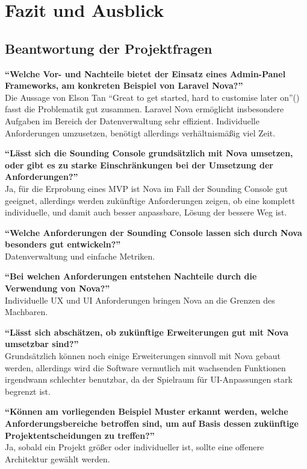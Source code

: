 \section{Fazit und Ausblick}

\subsection{Beantwortung der Projektfragen}

\textbf{\enquote{Welche Vor- und Nachteile bietet der Einsatz eines Admin-Panel Frameworks, am konkreten Beispiel von Laravel Nova?}}\\
Die Aussage von Elson Tan \enquote{Great to get started, hard to customise later on}(\cite{laravel-nova-in-production-one-year-later}) fasst die Problematik gut zusammen.
Laravel Nova ermöglicht insbesondere Aufgaben im Bereich der Datenverwaltung sehr effizient.
Individuelle Anforderungen umzusetzen, benötigt allerdings verhältnismäßig viel Zeit.

\textbf{\enquote{Lässt sich die Sounding Console grundsätzlich mit Nova umsetzen, oder gibt es zu starke Einschränkungen bei der Umsetzung der Anforderungen?}}\\
Ja, für die Erprobung eines MVP ist Nova im Fall der Sounding Console gut geeignet, allerdings werden zukünftige Anforderungen zeigen, ob eine komplett individuelle, und damit auch besser anpassbare, Lösung der bessere Weg ist.

\textbf{\enquote{Welche Anforderungen der Sounding Console lassen sich durch Nova besonders gut entwickeln?}}\\
Datenverwaltung und einfache Metriken.

\textbf{\enquote{Bei welchen Anforderungen entstehen Nachteile durch die Verwendung von Nova?}}\\
Individuelle UX und UI Anforderungen bringen Nova an die Grenzen des Machbaren.

\textbf{\enquote{Lässt sich abschätzen, ob zukünftige Erweiterungen gut mit Nova umsetzbar sind?}}\\
Grundsätzlich können noch einige Erweiterungen sinnvoll mit Nova gebaut werden, allerdings wird die Software vermutlich mit wachsenden Funktionen irgendwann schlechter benutzbar, da der Spielraum für UI-Anpassungen stark begrenzt ist.

\textbf{\enquote{Können am vorliegenden Beispiel Muster erkannt werden, welche Anforderungsbereiche betroffen sind, um auf Basis dessen zukünftige Projektentscheidungen zu treffen?}}\\
Ja, sobald ein Projekt größer oder individueller ist, sollte eine offenere Architektur gewählt werden.

